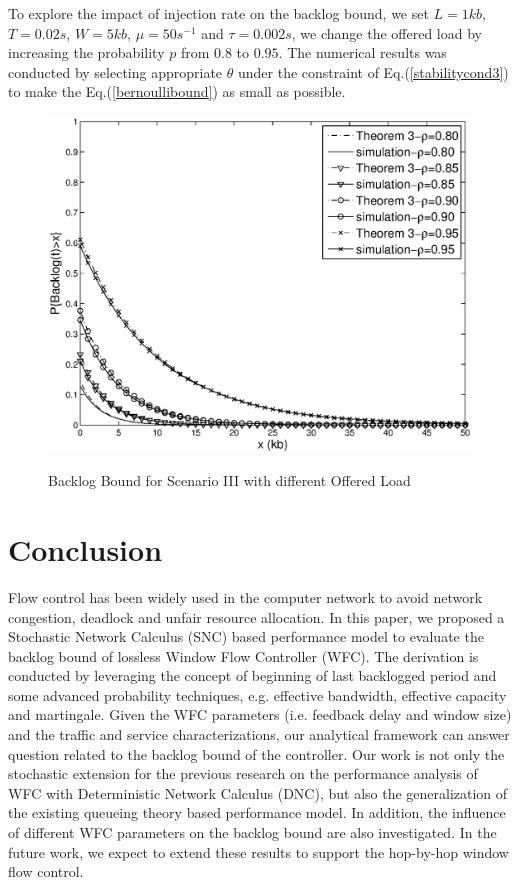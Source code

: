 \documentclass[12pt]{article}
\begin{document}
To explore the impact of injection rate on the backlog bound, we set $L=1kb$, $T=0.02s$, $W=5kb$, $\mu=50s^{-1}$ and $\tau=0.002s$, we change the offered load by increasing the probability $p$ from $0.8$ to $0.95$. The numerical results was conducted by selecting appropriate $\theta$ under the constraint of Eq.(\ref{stabilitycond3}) to make the Eq.(\ref{bernoullibound}) as small as possible.
\begin{figure}
  \centering
  \includegraphics[scale=0.45]{figures/backlogrho.eps}\\
  \caption{Backlog Bound for Scenario III with different Offered Load}\label{result2}
\end{figure}

\section{Conclusion}\label{concluson}
Flow control has been widely used in the computer network to avoid network congestion, deadlock and unfair resource allocation. In this paper, we proposed a Stochastic Network Calculus (SNC) based performance model to evaluate the backlog bound of lossless Window Flow Controller (WFC). The derivation is conducted by leveraging the concept of beginning of last backlogged period and some advanced probability techniques, e.g. effective bandwidth, effective capacity and martingale. Given the WFC parameters (i.e. feedback delay and window size) and the traffic and service characterizations, our analytical framework can answer question related to the backlog bound of the controller. Our work is not only the stochastic extension for the previous research on the performance analysis of WFC with Deterministic Network Calculus (DNC), but also the generalization of the existing queueing theory based performance model. In addition, the influence of different WFC parameters on the backlog bound are also investigated. In the future work, we expect to extend these results to support the hop-by-hop window flow control.
\end{document}

